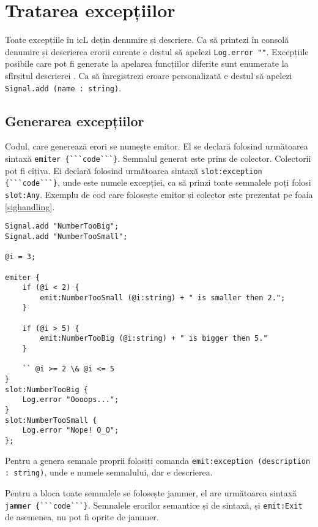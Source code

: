 \section{Tratarea excepțiilor}

Toate excepțiile în icL dețin denumire și descriere. Ca să printezi în consolă denumire și descrierea erorii curente e destul să apelezi \lstinline|Log.error ""|. Excepțiile posibile care pot fi generate la apelarea funcțiilor diferite sunt enumerate la sfîrșitul descrierei . Ca să înregistrezi eroare personalizată e destul să apelezi \lstinline|Signal.add (name : string)|.

\subsection{Generarea excepțiilor}

Codul, care generează erori se numește emitor. El se declară folosind următoarea sintaxă \lstinline|emiter {```code```}|. Semnalul generat este prins de colector. Colectorii pot fi cîțiva. Ei declară folosind următoarea sintaxă \lstinline|slot:exception {```code```}|,
unde  este numele excepției, ca să prinzi toate semnalele poți folosi \lstinline|slot:Any|. Exemplu de cod care folosește emitor și colector este prezentat pe foaia \ref{sighandling}.

\begin{lstlisting}[caption=Prelucrarea excepțiilor, label=sighandling]
Signal.add "NumberTooBig";
Signal.add "NumberTooSmall";

@i = 3;

emiter {
	if (@i < 2) {
		emit:NumberTooSmall (@i:string) + " is smaller then 2.";
	}

	if (@i > 5) {
		emit:NumberTooBig (@i:string) + " is bigger then 5."
	}

	`` @i >= 2 \& @i <= 5
}
slot:NumberTooBig {
	Log.error "Oooops...";
}
slot:NumberTooSmall {
	Log.error "Nope! O_O";
};
\end{lstlisting}

Pentru a genera semnale proprii folosiți comanda \lstinline|emit:exception (description : string)|, unde  e numele semnalului, dar  e descrierea.

Pentru a bloca toate semnalele se folosește jammer, el are următoarea sintaxă \lstinline|jammer {```code```}|. Semnalele erorilor semantice și de sintaxă, și \lstinline|emit:Exit| de asemenea, nu pot fi oprite de jammer.

